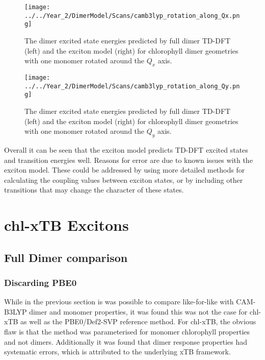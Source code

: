 \begin{figure}
    \centering
    \texttt{[image: ../../Year\_2/DimerModel/Scans/camb3lyp\_rotation\_along\_Qx.png]}
    \label{fig:camb3lyp_Qx_rotation}
    \caption{The dimer excited state energies predicted by full dimer TD-DFT (left)
    and the exciton model (right) for chlorophyll dimer geometries with one monomer
    rotated around the $Q_x$ axis.}
\end{figure}

\begin{figure}
    \centering
    \texttt{[image: ../../Year\_2/DimerModel/Scans/camb3lyp\_rotation\_along\_Qy.png]}
    \label{fig:camb3lyp_Qy_rotation}
    \caption{The dimer excited state energies predicted by full dimer TD-DFT (left)
    and the exciton model (right) for chlorophyll dimer geometries with one monomer
    rotated around the $Q_y$ axis.}
\end{figure}

Overall it can be seen that the exciton model predicts TD-DFT excited states and
transition energies well. Reasons for error are due to known issues with the exciton
model. These could be addressed by using more detailed methods for calculating the
coupling values between exciton states, or by including other transitions that may
change the character of these states.

\afterpartskip
\section{chl-xTB Excitons}
\label{sec:chl_xTB_excitons}

\subsection{Full Dimer comparison}
\label{subsec:pbe0_and_chl_xtb_dimer}

\subsubsection{Discarding PBE0}
\label{subsec:state_assign}

While in the previous section is was possible to compare like-for-like with CAM-B3LYP
dimer and monomer properties, it was found this was not the case for chl-xTB as 
well as the PBE0/Def2-SVP reference method. For chl-xTB, the obvious flaw is that
the method was parameterised for monomer chlorophyll properties and not dimers.
Additionally it was found that dimer response properties had systematic errors, 
which is attributed to the underlying xTB framework.

